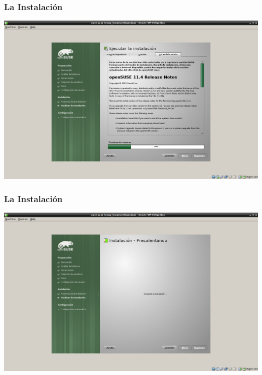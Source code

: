\documentclass{beamer}
\begin{document}
\begin{frame}
\frametitle{La Instalaci\'on}
\includegraphics[height=0.8\textheight]{18_.png} \hspace*{7.3cm}
\end{frame} 

\begin{frame}
\frametitle{La Instalaci\'on}
\includegraphics[height=0.8\textheight]{19.png} \hspace*{7.3cm}
\end{frame} 
\end{document}
